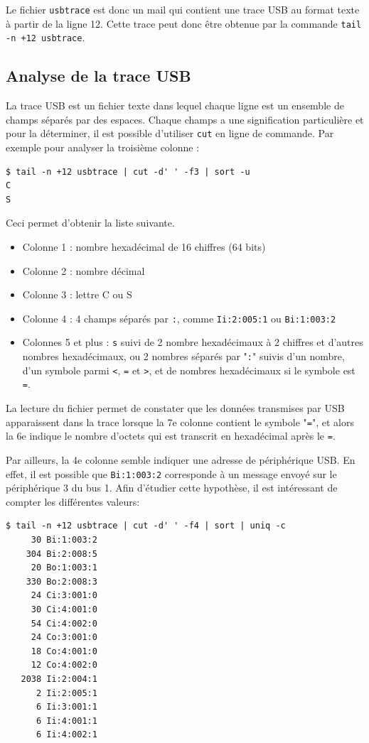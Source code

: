 \documentclass[a4paper,10pt]{article}
\begin{document}
Le fichier \texttt{usbtrace} est donc un mail qui contient une trace USB au format texte à partir de la ligne 12. Cette trace peut donc être obtenue par la commande \texttt{tail -n +12 usbtrace}.

\subsection{Analyse de la trace USB}

La trace USB est un fichier texte dans lequel chaque ligne est un ensemble de champs séparés par des espaces. Chaque champs a une signification particulière et pour la déterminer, il est possible d'utiliser \texttt{cut} en ligne de commande. Par exemple pour analyser la troisième colonne :
\begin{verbatim}
$ tail -n +12 usbtrace | cut -d' ' -f3 | sort -u
C
S
\end{verbatim}

Ceci permet d'obtenir la liste suivante.
\begin{itemize}
\item Colonne 1 : nombre hexadécimal de 16 chiffres (64 bits)
\item Colonne 2 : nombre décimal
\item Colonne 3 : lettre C ou S
\item Colonne 4 : 4 champs séparés par \texttt{:}, comme \texttt{Ii:2:005:1} ou \texttt{Bi:1:003:2}
\item Colonnes 5 et plus : \texttt{s} suivi de 2 nombre hexadécimaux à 2 chiffres et d'autres nombres hexadécimaux, ou 2 nombres séparés par "\texttt{:}" suivis d'un nombre, d'un symbole parmi \texttt{<}, \texttt{=} et \texttt{>}, et de nombres hexadécimaux si le symbole est \texttt{=}.
\end{itemize}

La lecture du fichier permet de constater que les données transmises par USB apparaissent dans la trace lorsque la 7e colonne contient le symbole "\texttt{=}", et alors la 6e indique le nombre d'octets qui est transcrit en hexadécimal après le \texttt{=}.

Par ailleurs, la 4e colonne semble indiquer une adresse de périphérique USB. En effet, il est possible que \texttt{Bi:1:003:2} corresponde à un message envoyé sur le périphérique 3 du bus 1. Afin d'étudier cette hypothèse, il est intéressant de compter les différentes valeurs:

\begin{verbatim}
$ tail -n +12 usbtrace | cut -d' ' -f4 | sort | uniq -c
     30 Bi:1:003:2
    304 Bi:2:008:5
     20 Bo:1:003:1
    330 Bo:2:008:3
     24 Ci:3:001:0
     30 Ci:4:001:0
     54 Ci:4:002:0
     24 Co:3:001:0
     18 Co:4:001:0
     12 Co:4:002:0
   2038 Ii:2:004:1
      2 Ii:2:005:1
      6 Ii:3:001:1
      6 Ii:4:001:1
      6 Ii:4:002:1
\end{verbatim}
\end{document}
